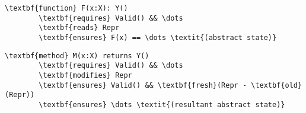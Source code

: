 \begin{Verbatim}[commandchars=\\\{\}]
    \textbf{function} F(x:X): Y()
        \textbf{requires} Valid() && \dots
        \textbf{reads} Repr
        \textbf{ensures} F(x) == \dots \textit{(abstract state)}
\end{Verbatim}

\begin{Verbatim}[commandchars=\\\{\}]
    \textbf{method} M(x:X) returns Y()
        \textbf{requires} Valid() && \dots
        \textbf{modifies} Repr
        \textbf{ensures} Valid() && \textbf{fresh}(Repr - \textbf{old}(Repr))
        \textbf{ensures} \dots \textit{(resultant abstract state)}
\end{Verbatim}